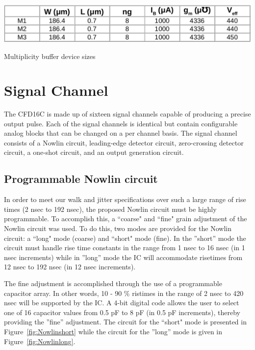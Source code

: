 \documentclass[12pt,oneside,final]{siuethesis}
\theoremstyle{definition}
\begin{document}
\begin{table}[htbp!]
 \centering
 \includegraphics[scale=.4,keepaspectratio=true]{./ch3_figures/mult_sizes.png}
 \caption{Multiplicity buffer device sizes}
 \label{tab:mult-sizes}
\end{table}


\section{Signal Channel}
\par The CFD16C is made up of sixteen signal channels capable of producing a precise output pulse. Each of the signal channels is identical but contain configurable analog blocks that can be changed on a per channel basis. The signal channel consists of a Nowlin circuit, leading-edge detector circuit, zero-crossing detector circuit, a one-shot circuit, and an output generation circuit. 

\subsection{Programmable Nowlin circuit}
\par In order to meet our walk and jitter specifications over such a large range of rise times (2 nsec to 192 nsec), the proposed Nowlin circuit must be highly programmable. To accomplish this, a ``coarse" and ``fine" grain adjustment of the Nowlin circuit was used. To do this, two modes are provided for the Nowlin circuit: a ``long" mode (coarse) and ``short" mode (fine). In the ”short” mode the circuit must handle rise time constants in the range from 1 nsec to 16 nsec (in 1 nsec increments) while in ”long” mode the  IC will accommodate risetimes from 12 nsec to 192 nsec (in 12 nsec increments).
\par The fine adjustment is accomplished through the use of a programmable capacitor array. In other words, 10 - 90 \% ristimes in the range of 2 nsec to 420 nsec will be supported by the IC. A 4-bit digital code allows the user to select one of 16 capacitor values from 0.5 pF to 8 pF (in 0.5 pF increments), thereby providing the ”fine” adjustment. The circuit for the ``short" mode is presented in Figure~\ref{fig:Nowlinshort} while the circuit for the ”long” mode is given in Figure~\ref{fig:Nowlinlong}. 
\end{document}
